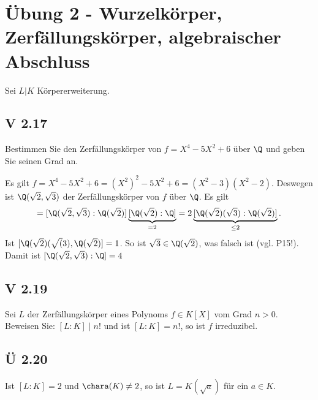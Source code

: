 
\section{Übung 2 - Wurzelkörper, Zerfällungskörper, algebraischer Abschluss}
Sei $L \vert K$ Körpererweiterung.
\subsection{V 2.17}
Bestimmen Sie den Zerfällungskörper von $f = X^4 - 5X^2 +6$ über $\Q$ und geben Sie seinen Grad an.

\begin{lösung}
	Es gilt $f = X^4 - 5X^2 + 6 = (X^2)^2 - 5X^2 +6 = (X^2-3)(X^2-2)$. Deswegen ist $\Q(\sqrt{2}, \sqrt{3})$ der Zerfällungskörper von $f$ über $\Q$. Es gilt
	\begin{align*}
		[\Q(\sqrt{2}), \sqrt{3}: \Q] = [\Q(\sqrt{2}, \sqrt{3}): \Q(\sqrt{2})]\underbrace{[\Q(\sqrt{2}): \Q]}_{=2} = 2\underbrace{[\Q(\sqrt{2})(\sqrt{3}):\Q(\sqrt{2})]}_{\le 2}.
	\end{align*}
	Ist $[\Q(\sqrt{2})(\sqrt(3),\Q(\sqrt{2})] = 1$. So ist $\sqrt{3} \in \Q(\sqrt{2})$, was falsch ist (vgl. P15!). Damit ist $[\Q(\sqrt{2},\sqrt{3}):\Q] = 4$
\end{lösung}

\subsection{V 2.19}
Sei $L$ der Zerfällungskörper eines Polynoms $f \in K[X]$ vom Grad $n >0$. Beweisen Sie: $[L:K] \mid n!$ und ist $[L:K] = n!$, so ist $f$ irreduzibel.

\begin{lösung}
	
\end{lösung}

\subsection{Ü 2.20}
Ist $[L:K] = 2$ und $\chara(K) \neq 2$, so ist $L = K(\sqrt{a})$ für ein $a \in K$.

